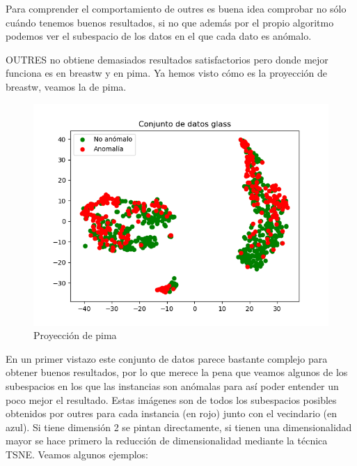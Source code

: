 Para comprender el comportamiento de outres es buena idea comprobar no sólo cuándo tenemos buenos resultados, si no que además por el propio algoritmo podemos ver el subespacio de los datos en el que cada dato es anómalo.

OUTRES no obtiene demasiados resultados satisfactorios pero donde mejor funciona es en breastw y en pima. Ya hemos visto cómo es la proyección de breastw, veamos la de pima.

\begin{figure}[H]
	\centering
	\label{pima}
	\includegraphics[scale=0.7]{imagenes/pima}
	\caption{Proyección de pima}
\end{figure}

En un primer vistazo este conjunto de datos parece bastante complejo para obtener buenos resultados, por lo que merece la pena que veamos algunos de los subespacios en los que las instancias son anómalas para así poder entender un poco mejor el resultado. Estas imágenes son de todos los subespacios posibles obtenidos por outres para cada instancia (en rojo) junto con el vecindario (en azul). Si tiene dimensión 2 se pintan directamente, si tienen una dimensionalidad mayor se hace primero la reducción de dimensionalidad mediante la técnica TSNE. Veamos algunos ejemplos:

